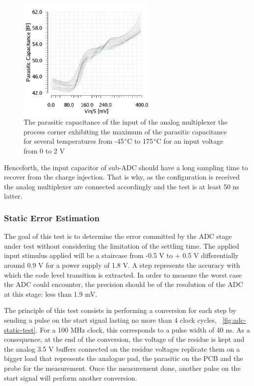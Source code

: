 \begin{figure}[htp]
    \centering
    \includegraphics[width=0.6\textwidth]{Chapter5/Figs/adc_chip/amux21-parasitic-ws-6s.png}
    \caption{The parasitic capacitance of the input of the analog multiplexer the process corner exhibiting the maximum of the parasitic capacitance for several temperatures from -45$\degree$C to 175$\degree$C for an input voltage from 0 to 2 V}
    \label{fig:adc-with-test}
\end{figure}

Henceforth, the input capacitor of sub-ADC should have a long sampling time to recover from the charge injection. That is why, as the configuration is received the analog multiplexer are connected accordingly and the test is at least 50 ns latter.

    \subsubsection{Static Error Estimation}
The goal of this test is to determine the error committed by the ADC stage under test without considering the limitation of the settling time. The applied input stimulus applied will be a staircase from -0.5 V to + 0.5 V differentially around 0.9 V for a power supply of 1.8 V. A step represents the accuracy with which the code level transition is extracted. In order to measure the worst case the ADC could encounter, the precision should be of the resolution of the ADC at this stage: less than 1.9 mV.

The principle of this test consists in performing a conversion for each step by sending a pulse on the start signal lasting no more than 4 clock cycles, \figurename~\ref{fig:adc-static-test}. For a 100 MHz clock, this corresponds to a pulse width of 40 ns. As a consequence, at the end of the conversion, the voltage of the residue is kept and the analog 3.5 V buffers connected on the residue voltages replicate them on a bigger load that represents the analogue pad, the parasitic on the PCB and the probe for the measurement. Once the measurement done, another pulse on the start signal will perform another conversion.

